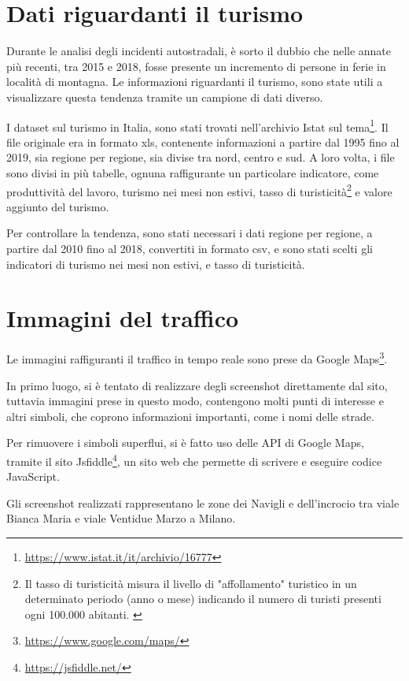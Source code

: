 \documentclass[a4paper,12pt]{report}
\begin{document}
\section{Dati riguardanti il turismo}

Durante le analisi degli incidenti autostradali, è sorto il dubbio che 
nelle annate più recenti, tra 2015 e 2018, 
fosse presente un incremento di persone in ferie in località di montagna. 
Le informazioni riguardanti il turismo, sono state utili a visualizzare questa tendenza 
tramite un campione di dati diverso. 

I dataset sul turismo in Italia, sono stati trovati nell'archivio Istat sul 
tema\footnote{\url{https://www.istat.it/it/archivio/16777}}. 
Il file originale era in formato xls, contenente informazioni a partire dal 1995 
fino al 2019, sia regione per regione, sia divise tra nord, centro e sud. 
A loro volta, i file sono divisi in più tabelle, ognuna raffigurante un particolare 
indicatore, come produttività del lavoro, turismo nei mesi non estivi, 
tasso di turisticità\footnote{Il tasso di turisticità misura il livello di "affollamento" 
turistico in un determinato periodo (anno o mese) indicando il numero di turisti presenti 
ogni 100.000 abitanti. \cite{ONTIT:1}} 
e valore aggiunto del turismo. 

Per controllare la tendenza, sono stati necessari i dati regione per regione, 
a partire dal 2010 fino al 2018, convertiti in formato csv, e sono stati scelti gli 
indicatori di turismo nei mesi non estivi, e tasso di turisticità. 

\section{Immagini del traffico}

Le immagini raffiguranti il traffico in tempo reale sono prese da Google 
Maps\footnote{\url{https://www.google.com/maps/}}. 

In primo luogo, si è tentato di realizzare degli screenshot direttamente dal sito, 
tuttavia immagini prese in questo modo, contengono molti punti di interesse e altri simboli, 
che coprono informazioni importanti, come i nomi delle strade. 

Per rimuovere i simboli superflui, si è fatto uso delle API di Google Maps, 
tramite il sito Jsfiddle\footnote{\url{https://jsfiddle.net/}}, un sito web che permette di 
scrivere e eseguire codice JavaScript. 

Gli screenshot realizzati rappresentano le zone dei Navigli 
e dell'incrocio tra viale Bianca Maria e viale Ventidue Marzo a Milano. 
\end{document}
